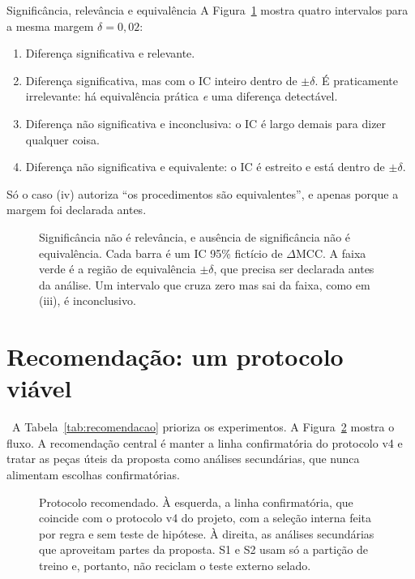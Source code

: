 \documentclass[11pt,a4paper]{article}
\newcommand{\etiqueta}[2]{\tcbox[on line, colback=#1!10, colframe=#1!75!black,
  boxrule=0.4pt, arc=1.2pt, left=1.5pt, right=1.5pt, top=0pt, bottom=0pt,
  fontupper=\sffamily\scriptsize\bfseries]{#2}}
\newcommand{\rec}{\etiqueta{oiVerm}{Recomendação}}
\begin{document}
\begin{exemplo}{Significância, relevância e equivalência}
A Figura~\ref{fig:intervalos} mostra quatro intervalos para a mesma margem $\delta=0{,}02$:
\begin{enumerate}[label=(\roman*), leftmargin=1.6em]
\item Diferença significativa e relevante.
\item Diferença significativa, mas com o IC inteiro dentro de $\pm\delta$. É praticamente irrelevante: há equivalência prática \emph{e} uma diferença detectável.
\item Diferença não significativa e inconclusiva: o IC é largo demais para dizer qualquer coisa.
\item Diferença não significativa e equivalente: o IC é estreito e está dentro de $\pm\delta$.
\end{enumerate}
Só o caso (iv) autoriza ``os procedimentos são equivalentes'', e apenas porque a margem foi declarada antes.
\end{exemplo}

\begin{figure}[h]
\centering

\caption{Significância não é relevância, e ausência de significância não é equivalência. Cada barra é um IC 95\% fictício de $\Delta$MCC. A faixa verde é a região de equivalência $\pm\delta$, que precisa ser declarada antes da análise. Um intervalo que cruza zero mas sai da faixa, como em (iii), é inconclusivo.}
\label{fig:intervalos}
\end{figure}

\section{Recomendação: um protocolo viável}
\label{sec:recomendacao}

\rec\ A Tabela~\ref{tab:recomendacao} prioriza os experimentos. A Figura~\ref{fig:protocolo} mostra o fluxo. A recomendação central é manter a linha confirmatória do protocolo v4 e tratar as peças úteis da proposta como análises secundárias, que nunca alimentam escolhas confirmatórias.

\begin{figure}[t]
\centering

\caption{Protocolo recomendado. À esquerda, a linha confirmatória, que coincide com o protocolo v4 do projeto, com a seleção interna feita por regra e sem teste de hipótese. À direita, as análises secundárias que aproveitam partes da proposta. S1 e S2 usam só a partição de treino e, portanto, não reciclam o teste externo selado.}
\label{fig:protocolo}
\end{figure}
\end{document}
